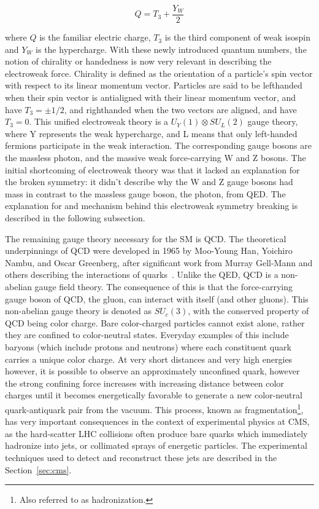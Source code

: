 \begin{equation}
\label{eqn:hypercharge}
Q = T_{3} + \frac{Y_{W}}{2}
\end{equation}
 
\noindent where $Q$ is the familiar electric charge, $T_{3}$ is the third component of weak isospin and $Y_{W}$ is the hypercharge. With these newly introduced quantum numbers,
the notion of chirality or handedness is now very relevant
in describing the electroweak force. Chirality is defined as the orientation of a particle's spin vector with respect to its linear momentum vector.
Particles are said to be lefthanded when their spin vector is antialigned with
their linear momentum vector, and have $T_{3}=\pm 1/2$, and righthanded when the two vectors are aligned, and have $T_{3}=0$.  
This unified electroweak theory is a
$U_{Y}(1) \otimes SU_{L}(2)$ gauge theory, where Y represents the weak hypercharge, and L means that only left-handed fermions participate in the weak interaction. 
The corresponding gauge bosons are the massless photon, and the massive weak force-carrying W and Z bosons.
The initial shortcoming of electroweak theory was that it lacked an explanation for the broken symmetry:
it didn't describe why the W and Z gauge bosons had mass in contrast to the massless gauge boson, the photon, from QED. 
The explanation for and mechanism behind this electroweak symmetry breaking is described in the following subsection.

The remaining gauge theory necessary for the SM is QCD. The theoretical underpinnings of QCD were developed in 1965 by Moo-Young Han, Yoichiro Nambu, and Oscar Greenberg, after
significant work from Murray Gell-Mann and others describing the interactions of quarks~\cite{NP69}.  
Unlike the QED, QCD is a non-abelian gauge field theory. The consequence of this is that the force-carrying gauge boson
of QCD, the gluon, can interact with itself (and other gluons). This non-abelian gauge theory is denoted as $SU_{c}(3)$, with the conserved property of QCD being color charge.
Bare color-charged particles
cannot exist alone, rather they are confined to color-neutral states. Everyday examples of this include baryons (which include protons and neutrons) where each constituent quark
carries a unique color charge. At very short distances and very high energies however, it is possible to observe an approximately unconfined quark, however the strong confining
force increases with increasing distance between color charges until it becomes energetically favorable to generate a new color-neutral quark-antiquark pair from the vacuum.
This process, known as fragmentation\footnote{Also referred to as hadronization.}, has very important consequences in the context of experimental physics at CMS, as the hard-scatter LHC
collisions often produce bare quarks which immediately hadronize into jets, or collimated sprays of energetic particles.
The experimental techniques used to detect and reconstruct these jets are described in the Section~\ref{sec:cms}. 

